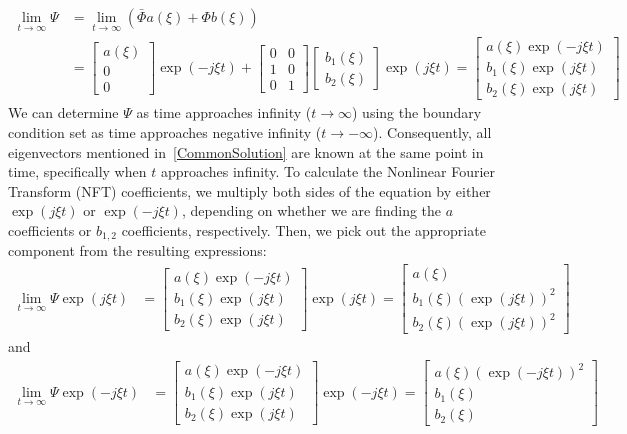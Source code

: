 $$
\begin{aligned}
\lim _{t \rightarrow \infty} \Psi & =\lim _{t \rightarrow \infty}\left(\bar{\Phi} a(\xi)+\Phi b(\xi)\right) \\
& =\left[\begin{array}{c}
a(\xi) \\
0 \\
0
\end{array}\right] \exp (-j \xi t)+\left[\begin{array}{ll}
0 & 0 \\
1 & 0 \\
0 & 1
\end{array}\right]\left[\begin{array}{l}
b_{1}(\xi) \\
b_{2}(\xi)
\end{array}\right] \exp (j \xi t)
 =\left[\begin{array}{c}
a(\xi) \exp (-j \xi t) \\
b_{1}(\xi) \exp (j \xi t) \\
b_{2}(\xi) \exp (j \xi t)
\end{array}\right]
\end{aligned}
$$
We can determine \(\Psi\) as time approaches infinity (\(t \rightarrow \infty\)) using the boundary condition set as time approaches negative infinity (\(t \rightarrow -\infty\)). Consequently, all eigenvectors mentioned in~\eqref{CommonSolution} are known at the same point in time, specifically when \(t\) approaches infinity. To calculate the Nonlinear Fourier Transform (NFT) coefficients, we multiply both sides of the equation by either \(\exp (j \xi t)\) or \(\exp (-j \xi t)\), depending on whether we are finding the \(a\) coefficients or \(b_{1,2}\) coefficients, respectively. Then, we pick out the appropriate component from the resulting expressions:
$$
\begin{aligned}
\lim _{t \rightarrow \infty} \Psi \exp (j \xi t) & =\left[\begin{array}{c}
a(\xi) \exp (-j \xi t) \\
b_1(\xi) \exp (j \xi t) \\
b_2(\xi) \exp (j \xi t)
\end{array}\right] \exp (j \xi t) =\left[\begin{array}{c}
a(\xi) \\
b_1(\xi)(\exp (j \xi t))^2 \\
b_2(\xi)(\exp (j \xi t))^2
\end{array}\right]
\end{aligned}
$$
and
$$
\begin{aligned}
\lim _{t \rightarrow \infty} \Psi \exp (-j \xi t) & =\left[\begin{array}{c}
a(\xi) \exp (-j \xi t) \\
b_1(\xi) \exp (j \xi t) \\
b_2(\xi) \exp (j \xi t)
\end{array}\right] \exp (-j \xi t) =\left[\begin{array}{c}
a(\xi)(\exp (-j \xi t))^2 \\
b_1(\xi) \\
b_2(\xi)
\end{array}\right]
\end{aligned}
$$


